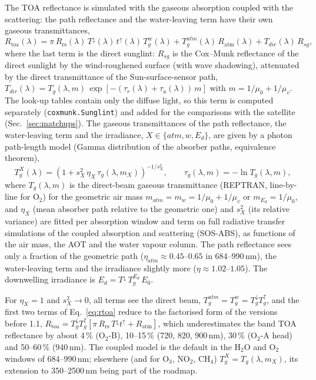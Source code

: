 \documentclass[11pt,a4paper]{article}
\newcommand{\Rtoa}{R_\mathrm{toa}}
\newcommand{\Rrs}{R_\mathrm{rs}}
\newcommand{\code}[1]{\texttt{#1}}
\begin{document}
The TOA reflectance is simulated with the gaseous absorption coupled with the scattering: the path
reflectance and the water-leaving term have their own gaseous transmittances,
\begin{equation}
\Rtoa(\lambda) = \pi\, \Rrs(\lambda)\, T^{\downarrow}(\lambda)\, t^{\uparrow}(\lambda)\, T_g^{w}(\lambda)
+ T_g^{atm}(\lambda)\, R_\mathrm{atm}(\lambda)
+ T_{dir}(\lambda)\, R_{sg},
\label{eq:rtoa}
\end{equation}
where the last term is the direct sunglint: $R_{sg}$ is the Cox--Munk reflectance of the direct sunlight by the
wind-roughened surface (with wave shadowing), attenuated by the direct transmittance of the
Sun-surface-sensor path, $T_{dir}(\lambda) = T_g(\lambda, m)\, \exp[-(\tau_r(\lambda)+\tau_a(\lambda))\, m]$
with $m = 1/\mu_0+1/\mu_v$. The look-up tables contain only the diffuse light, so this term is computed
separately (\code{coxmunk.Sunglint}) and added for the comparisons with the satellite (Sec.~\ref{sec:matchups}).
The gaseous transmittances of the path reflectance, the water-leaving term and the irradiance,
$X\in\{atm, w, E_d\}$, are given by a photon path-length model (Gamma distribution of the absorber
paths, equivalence theorem),
\begin{equation}
T_g^{X}(\lambda) = \left(1 + s_X^2\, \eta_X\, \tau_g(\lambda, m_X)\right)^{-1/s_X^2},
\qquad \tau_g(\lambda, m) = -\ln T_g(\lambda, m),
\label{eq:ppld}
\end{equation}
where $T_g(\lambda, m)$ is the direct-beam gaseous transmittance (REPTRAN, line-by-line for O$_2$) for the
geometric air mass $m_{atm}=m_w=1/\mu_0+1/\mu_v$ or $m_{E_d}=1/\mu_0$, and $\eta_X$ (mean absorber path relative
to the geometric one) and $s_X^2$ (its relative variance) are fitted per absorption window and term on full
radiative transfer simulations of the coupled absorption and scattering (SOS-ABS), as functions of the air
mass, the AOT and the water vapour column. The path reflectance sees only a fraction of the geometric path
($\eta_{atm}\approx0.45$--$0.65$ in 684--990\,nm), the water-leaving term and the irradiance slightly more
($\eta\approx1.02$--$1.05$). The downwelling irradiance is $E_d = T^{\downarrow}\, T_g^{E_d}\, E_0$.

For $\eta_X=1$ and $s_X^2\to0$, all terms see the direct beam, $T_g^{atm}=T_g^{w}=T_g^{\downarrow}T_g^{\uparrow}$,
and the first two terms of Eq.~\eqref{eq:rtoa} reduce to the factorised form of the versions before 1.1,
$\Rtoa = T_g^{\downarrow} T_g^{\uparrow}\left[\pi\,\Rrs\,T^{\downarrow}t^{\uparrow} + R_\mathrm{atm}\right]$, which
underestimates the band TOA reflectance by about 4\,\% (O$_2$-B), 10--15\,\% (720, 820, 900\,nm), 30\,\%
(O$_2$-A head) and 50--60\,\% (940\,nm). The coupled model is the default in the H$_2$O and O$_2$ windows of
684--990\,nm; elsewhere (and for O$_3$, NO$_2$, CH$_4$) $T_g^X = T_g(\lambda, m_X)$, its extension to
350--2500\,nm being part of the roadmap.
\end{document}
